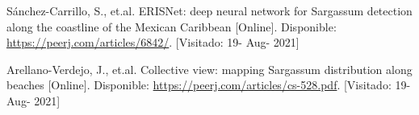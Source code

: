 \documentclass[conference]{IEEEtran}
\begin{document}
\begin{thebibliography}{}

 Sánchez-Carrillo, S., et.al. ERISNet: deep neural network for Sargassum detection along the coastline of the Mexican Caribbean [Online]. Disponible: \url{https://peerj.com/articles/6842/}. [Visitado: 19- Aug- 2021]

 Arellano-Verdejo, J., et.al. Collective view: mapping Sargassum distribution along beaches [Online]. Disponible: \url{https://peerj.com/articles/cs-528.pdf}. [Visitado: 19- Aug- 2021]

\end{thebibliography}
\end{document}
